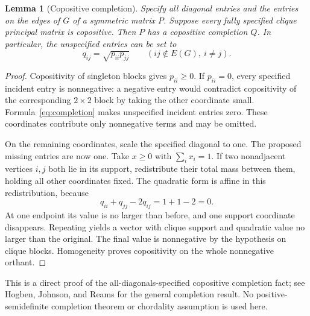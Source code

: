 \documentclass[11pt,a4paper]{article}
\newtheorem{lemma}[theorem]{Lemma}
\theoremstyle{definition}
\begin{document}
\begin{lemma}[Copositive completion]\label{lem:completion}
Specify all diagonal entries and the entries on the edges of $G$ of a symmetric matrix $P$. Suppose every fully specified clique principal matrix is copositive. Then $P$ has a copositive completion $Q$. In particular, the unspecified entries can be set to
\begin{equation}\label{eq:completion}
 q_{ij}=\sqrt{p_{ii}p_{jj}}\qquad(ij\notin E(G),\ i\ne j).
\end{equation}
\end{lemma}
\begin{proof}
Copositivity of singleton blocks gives $p_{ii}\geq0$. If $p_{ii}=0$, every specified incident entry is nonnegative: a negative entry would contradict copositivity of the corresponding $2\times2$ block by taking the other coordinate small. Formula~\eqref{eq:completion} makes unspecified incident entries zero. These coordinates contribute only nonnegative terms and may be omitted.

On the remaining coordinates, scale the specified diagonal to one. The proposed missing entries are now one. Take $x\geq0$ with $\sum_i x_i=1$. If two nonadjacent vertices $i,j$ both lie in its support, redistribute their total mass between them, holding all other coordinates fixed. The quadratic form is affine in this redistribution, because
\[
 q_{ii}+q_{jj}-2q_{ij}=1+1-2=0.
\]
At one endpoint its value is no larger than before, and one support coordinate disappears. Repeating yields a vector with clique support and quadratic value no larger than the original. The final value is nonnegative by the hypothesis on clique blocks. Homogeneity proves copositivity on the whole nonnegative orthant.
\end{proof}

This is a direct proof of the all-diagonals-specified copositive completion fact; see Hogben, Johnson, and Reams \cite{completion} for the general completion result. No positive-semidefinite completion theorem or chordality assumption is used here.
\end{document}
